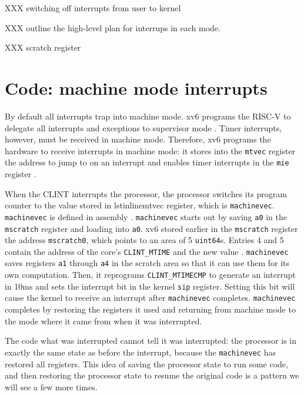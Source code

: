 XXX switching off interrupts from user to kernel

XXX outline the high-level plan for interrups in each mode.

XXX scratch register

\section{Code: machine mode interrupts}

By default all interrupts trap into machine mode.  xv6 programs the
RISC-V to delegate all interrupts and exceptions to supervisor mode
.
Timer interrupts, however, must be received in machine
mode. Therefore, xv6 programs the hardware to receive interrupts in
machine mode: it stores into the \lstinline{mtvec} register the
address to jump to on an interrupt 
and enables timer interrupts in the \lstinline{mie} register
.

When the CLINT interrupts the processor, the processor switches its program
counter to the value stored in lstinline{mtvec} register, which is
\lstinline{machinevec}.  \lstinline{machinevec} is defined in assembly
.  \lstinline{machinevec}
starts out by saving \lstinline{a0} in the \lstinline{mscratch} register
and loading into \lstinline{a0}.  xv6 stored earlier in the
\lstinline{mscratch} register  the
address \lstinline{mscratch0}, which points to an area of 5
\lstinline{uint64}s.  Entries 4 and 5 contain the address of the
core's \lstinline{CLINT_MTIME} and the new value
.
\lstinline{machinevec} saves registers \lstinline{a1} through
\lstinline{a4} in the scratch area so that it can use them for its own
computation.  Then, it reprograms \lstinline{CLINT_MTIMECMP} to
generate an interrupt in 10ms and sets the interrupt bit in the kernel
\lstinline{sip} register.  Setting this bit will cause the kernel to
receive an interrupt after \lstinline{machinevec} completes.
\lstinline{machinevec} completes by restoring the registers it used
and returning from machine mode  to
the mode where it came from when it was interrupted.

The code what was interrupted cannot tell it was interrupted: the
processor is in exactly the same state as before the interrupt,
because the \lstinline{machinevec} has restored all registers.  This
idea of saving the processor state to run some code, and then
restoring the processor state to resume the original code is a pattern
we will see a few more times.

